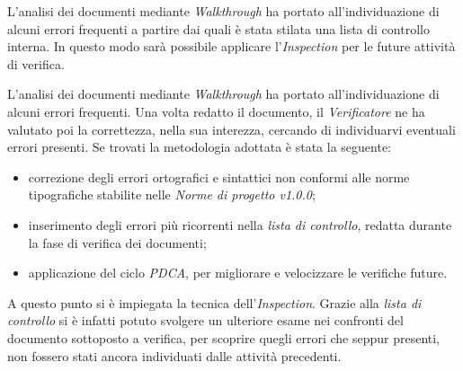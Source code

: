 L'analisi dei documenti mediante \textit{Walkthrough}\glo{} ha portato 
all'individuazione di alcuni errori frequenti a partire dai quali è stata 
stilata una lista di controllo interna. In questo modo sarà possibile applicare
l'\textit{Inspection}\glo{} per le future attività di verifica.

L’analisi dei documenti mediante \textit{Walkthrough}\glo{} ha portato all’individuazione di alcuni errori frequenti. 
Una volta redatto il documento, il \textit{Verificatore} ne ha valutato poi la correttezza, nella sua interezza, cercando di individuarvi eventuali errori presenti. 
Se trovati la metodologia adottata è stata la seguente:
\begin{itemize}
    \item correzione degli errori ortografici e sintattici non conformi alle norme tipografiche stabilite nelle \textit{Norme di progetto v1.0.0};
    \item inserimento degli errori più ricorrenti nella \textit{lista di controllo}\glo{}, redatta durante la fase di verifica dei documenti;
    \item applicazione del ciclo \textit{PDCA}\glo{}, per migliorare e velocizzare le verifiche future. 
\end{itemize} 

A questo punto si è impiegata la tecnica dell'\textit{Inspection}\glo{}. 
Grazie alla \textit{lista di controllo}\glo{} si è infatti potuto svolgere un ulteriore esame nei confronti del documento sottoposto a verifica, per scoprire quegli errori che seppur presenti, non fossero stati ancora individuati dalle attività precedenti.
